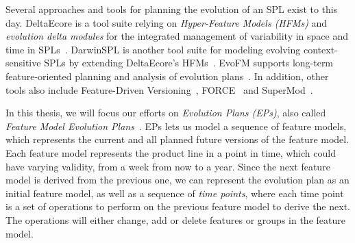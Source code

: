 \documentclass[a4paper,english]{ifimaster}
\begin{document}
Several approaches and tools for planning the evolution of an SPL exist to this day. DeltaEcore is a tool suite relying on \textit{Hyper-Feature Models (HFMs)} and \textit{evolution delta modules} for the integrated management of variability in space and time in SPLs~\cite{cite:s02_deltaecore}. DarwinSPL is another tool suite for modeling evolving context-sensitive SPLs by extending DeltaEcore's HFMs~\cite{cite:s17_darwinspl}. EvoFM supports long-term feature-oriented planning and analysis of evolution plans~\cite{cite:evofm_fm_planning}. In addition, other tools also include Feature-Driven Versioning~\cite{cite:feature_driven_versioning}, FORCE~\cite{cite:force} and SuperMod~\cite{cite:supermod}.

In this thesis, we will focus our efforts on \textit{Evolution Plans (EPs)}, also called \textit{Feature Model Evolution Plans}~\cite{cite:consistency_preserving_evolution_planning}. EPs lets us model a sequence of feature models, which represents the current and all planned future versions of the feature model. Each feature model represents the product line in a point in time, which could have varying validity, from a week from now to a year. Since the next feature model is derived from the previous one, we can represent the evolution plan as an initial feature model, as well as a sequence of \textit{time points}, where each time point is a set of operations to perform on the previous feature model to derive the next. The operations will either change, add or delete features or groups in the feature model.
\end{document}
